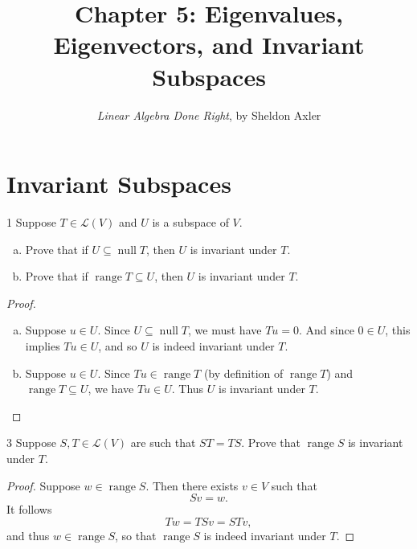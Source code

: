 \documentclass{extarticle}
\title{\vspace{-2em}Chapter 5: Eigenvalues, Eigenvectors, and Invariant Subspaces}
\author{\emph{Linear Algebra Done Right}, by Sheldon Axler}
\newenvironment{problem}[1]{\begin{prob*}{#1}{}}{\end{prob*}}
\newcommand{\Hom}{\mathcal{L}}
\DeclareMathOperator{\Null}{null}
\DeclareMathOperator{\Range}{range}
\begin{document}
\maketitle



\section{Invariant Subspaces}

\begin{problem}{1}
Suppose $T\in\Hom(V)$ and $U$ is a subspace of $V$.
\begin{enumerate}[(a)]
\item Prove that if $U\subseteq \Null T$, then $U$ is invariant under $T$.
\item Prove that if $\Range T\subseteq U$, then $U$ is invariant under $T$.
\end{enumerate}
\end{problem}
\begin{proof}
\begin{enumerate}[(a)]
\item Suppose $u\in U$.  Since $U\subseteq\Null T$, we must have $Tu = 0$. And since $0\in U$, this implies $Tu\in U$, and so $U$ is indeed invariant under $T$.
\item Suppose $u\in U$.  Since $Tu\in \Range T$ (by definition of $\Range T$) and $\Range T\subseteq U$, we have $Tu\in U$.  Thus $U$ is invariant under $T$.  
\end{enumerate}
\end{proof}

\begin{problem}{3}
Suppose $S,T\in\Hom(V)$ are such that $ST = TS$.  Prove that $\Range S$ is invariant under $T$.
\end{problem}
\begin{proof}
Suppose $w\in\Range S$.  Then there exists $v\in V$ such that
\begin{equation*}
Sv = w.
\end{equation*}
It follows
\begin{equation*}
Tw = TSv = STv,
\end{equation*}
and thus $w\in \Range S$, so that $\Range S$ is indeed invariant under $T$.
\end{proof}
\end{document}
